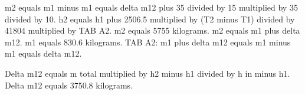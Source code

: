 m2 equals m1 minus m1 equals delta m12 plus 35 divided by 15 multiplied by 35 divided by 10.  
h2 equals h1 plus 2506.5 multiplied by (T2 minus T1) divided by 41804 multiplied by TAB A2.  
m2 equals 5755 kilograms.  
m2 equals m1 plus delta m12.  
m1 equals 830.6 kilograms.  
TAB A2:  
m1 plus delta m12 equals m1 minus m1 equals delta m12.

Delta m12 equals m total multiplied by h2 minus h1 divided by h in minus h1.  
Delta m12 equals 3750.8 kilograms.